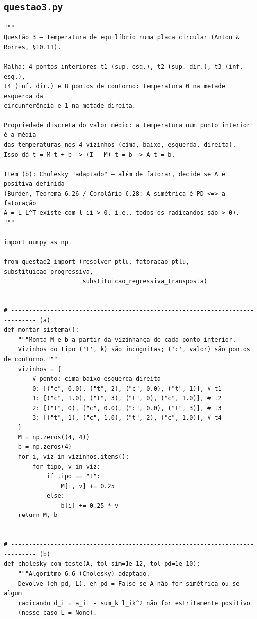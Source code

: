 \documentclass{article}
\theoremstyle{remark}
\begin{document}
\subsection*{\texttt{questao3.py}}
\begin{lstlisting}
"""
Questão 3 — Temperatura de equilíbrio numa placa circular (Anton & Rorres, §10.11).

Malha: 4 pontos interiores t1 (sup. esq.), t2 (sup. dir.), t3 (inf. esq.),
t4 (inf. dir.) e 8 pontos de contorno: temperatura 0 na metade esquerda da
circunferência e 1 na metade direita.

Propriedade discreta do valor médio: a temperatura num ponto interior é a média
das temperaturas nos 4 vizinhos (cima, baixo, esquerda, direita).
Isso dá t = M t + b -> (I - M) t = b -> A t = b.

Item (b): Cholesky "adaptado" — além de fatorar, decide se A é positiva definida
(Burden, Teorema 6.26 / Corolário 6.28: A simétrica é PD <=> a fatoração
A = L L^T existe com l_ii > 0, i.e., todos os radicandos são > 0).
"""

import numpy as np

from questao2 import (resolver_ptlu, fatoracao_ptlu, substituicao_progressiva,
                      substituicao_regressiva_transposta)


# ----------------------------------------------------------------------------- (a)
def montar_sistema():
    """Monta M e b a partir da vizinhança de cada ponto interior.
    Vizinhos do tipo ('t', k) são incógnitas; ('c', valor) são pontos de contorno."""
    vizinhos = {
        # ponto: cima baixo esquerda direita
        0: [("c", 0.0), ("t", 2), ("c", 0.0), ("t", 1)], # t1
        1: [("c", 1.0), ("t", 3), ("t", 0), ("c", 1.0)], # t2
        2: [("t", 0), ("c", 0.0), ("c", 0.0), ("t", 3)], # t3
        3: [("t", 1), ("c", 1.0), ("t", 2), ("c", 1.0)], # t4
    }
    M = np.zeros((4, 4))
    b = np.zeros(4)
    for i, viz in vizinhos.items():
        for tipo, v in viz:
            if tipo == "t":
                M[i, v] += 0.25
            else:
                b[i] += 0.25 * v
    return M, b


# ----------------------------------------------------------------------------- (b)
def cholesky_com_teste(A, tol_sim=1e-12, tol_pd=1e-10):
    """Algoritmo 6.6 (Cholesky) adaptado.
    Devolve (eh_pd, L). eh_pd = False se A não for simétrica ou se algum
    radicando d_i = a_ii - sum_k l_ik^2 não for estritamente positivo
    (nesse caso L = None).


\end{lstlisting}
\end{document}

